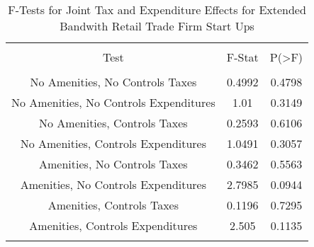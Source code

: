 
\begin{table}[!htbp] \centering 
  \caption{F-Tests for Joint Tax and Expenditure Effects for Extended Bandwith Retail Trade Firm Start Ups} 
  \label{44-45Ftests} 
\begin{tabular}{@{\extracolsep{5pt}} ccc} 
\\[-1.8ex]\hline 
\hline \\[-1.8ex] 
Test & F-Stat & P(\textgreater F) \\ 
\hline \\[-1.8ex] 
No Amenities, No Controls Taxes & 0.4992 & 0.4798 \\ 
No Amenities, No Controls Expenditures & 1.01 & 0.3149 \\ 
No Amenities, Controls Taxes & 0.2593 & 0.6106 \\ 
No Amenities, Controls Expenditures & 1.0491 & 0.3057 \\ 
Amenities, No Controls Taxes & 0.3462 & 0.5563 \\ 
Amenities, No Controls Expenditures & 2.7985 & 0.0944 \\ 
Amenities, Controls Taxes & 0.1196 & 0.7295 \\ 
Amenities, Controls Expenditures & 2.505 & 0.1135 \\ 
\hline \\[-1.8ex] 
\end{tabular} 
\end{table} 
